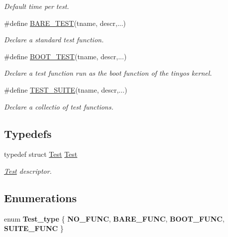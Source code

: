 \begin{DoxyCompactItemize}
\begin{DoxyCompactList}\small\item\em Default time per test. \end{DoxyCompactList}\item 
\#define \hyperlink{group__Testing_gadeb59351f026036674baa906f32ccd5c}{B\-A\-R\-E\-\_\-\-T\-E\-S\-T}(tname, descr,...)
\begin{DoxyCompactList}\small\item\em Declare a standard test function. \end{DoxyCompactList}\item 
\#define \hyperlink{group__Testing_gadaaab439c094503b6ed7c313ad082f10}{B\-O\-O\-T\-\_\-\-T\-E\-S\-T}(tname, descr,...)
\begin{DoxyCompactList}\small\item\em Declare a test function run as the boot function of the tinyos kernel. \end{DoxyCompactList}\item 
\#define \hyperlink{group__Testing_ga3e52396e466caa8cba74e1ae603817d3}{T\-E\-S\-T\-\_\-\-S\-U\-I\-T\-E}(tname, descr,...)
\begin{DoxyCompactList}\small\item\em Declare a collectio of test functions. \end{DoxyCompactList}\end{DoxyCompactItemize}
\subsection*{Typedefs}
\begin{DoxyCompactItemize}
\item 
typedef struct \hyperlink{structTest}{Test} \hyperlink{group__Testing_ga8900225cc98bb7c7fb170b8694e1f7a4}{Test}
\begin{DoxyCompactList}\small\item\em \hyperlink{structTest}{Test} descriptor. \end{DoxyCompactList}\end{DoxyCompactItemize}
\subsection*{Enumerations}
\begin{DoxyCompactItemize}
\item 
enum {\bfseries Test\-\_\-type} \{ {\bfseries N\-O\-\_\-\-F\-U\-N\-C}, 
{\bfseries B\-A\-R\-E\-\_\-\-F\-U\-N\-C}, 
{\bfseries B\-O\-O\-T\-\_\-\-F\-U\-N\-C}, 
{\bfseries S\-U\-I\-T\-E\-\_\-\-F\-U\-N\-C}
 \}
\end{DoxyCompactItemize}
